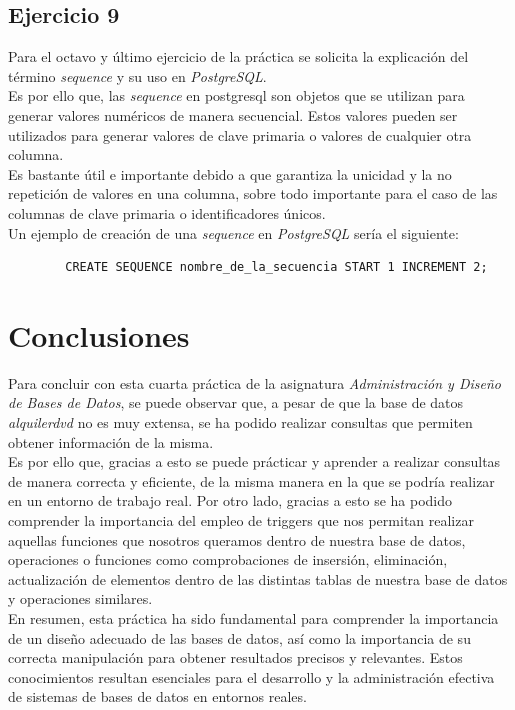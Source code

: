 \documentclass[11pt]{report}
\begin{document}
	\section{Ejercicio 9}
	Para el octavo y último ejercicio de la práctica se solicita la explicación del término \emph{sequence} y su uso en \emph{PostgreSQL}.
\\
	Es por ello que, las \emph{sequence} en postgresql son objetos que se utilizan para generar valores numéricos de manera secuencial. Estos valores pueden ser utilizados para generar valores de clave primaria o valores de cualquier otra columna.
\\
	Es bastante útil e importante debido a que garantiza la unicidad y la no repetición de valores en una columna, sobre todo importante para el caso de las columnas de clave primaria o identificadores únicos.
\\
	Un ejemplo de creación de una \emph{sequence} en \emph{PostgreSQL} sería el siguiente:

	\begin{verbatim}
		CREATE SEQUENCE nombre_de_la_secuencia START 1 INCREMENT 2;
	\end{verbatim}

	\chapter{Conclusiones}
  Para concluir con esta cuarta práctica de la asignatura \emph{Administración y Diseño de Bases de Datos}, se puede observar que, a pesar de que la base de datos \emph{alquilerdvd} no es muy extensa, se ha podido realizar consultas que permiten obtener información de la misma.
\\
	Es por ello que, gracias a esto se puede prácticar y aprender a realizar consultas de manera correcta y eficiente, de la misma manera en la que se podría realizar en un entorno de trabajo real. Por otro lado, gracias a esto se ha podido comprender la importancia del empleo de triggers que nos permitan realizar aquellas funciones que nosotros queramos dentro de nuestra base de datos, operaciones o funciones como comprobaciones de insersión, eliminación, actualización de elementos dentro de las distintas tablas de nuestra base de datos y operaciones similares. 
\\
	En resumen, esta práctica ha sido fundamental para comprender la importancia de un diseño adecuado de las bases de datos, así como la importancia de su correcta manipulación para obtener resultados precisos y relevantes. Estos conocimientos resultan esenciales para el desarrollo y la administración efectiva de sistemas de bases de datos en entornos reales. 
\\
\end{document}
